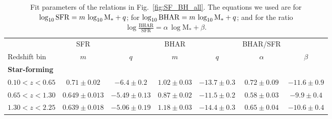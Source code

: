 \begin{table}
\caption{Fit parameters of the relations in Fig.~\ref{fig:SF_BH_all}. The equations we used are for $\log_{10}{\rm SFR}=m\,\log_{10}{\rm M}_*+q$; for $\log_{10}{\rm BHAR}=m\,\log_{10}{\rm M}_*+q$; and for the ratio $\log\frac{\text{BHAR}}{\text{SFR}}=\alpha\,\log\text{M}_*+\beta$.}             %
\label{table:all_fitpar}      %
\centering                          %
\begin{tabular}{l | c c | c c | c c }        %
\hline\hline                 %
              & SFR                 &                  & BHAR              &                   & BHAR/SFR          &                    \\
Redshift bin  & $m $                & $q$              & $m$               & $q$               & $\alpha$          & $\beta$            \\    %
\hline                                                                                                           
\textbf{Star-forming} &              &                  &                   &                   &                   &       \\
$0.10<z<0.65$ & $ 0.71  \pm 0.02  $ & $ -6.4 \pm 0.2 $ & $ 1.02 \pm 0.03 $ & $-13.7 \pm 0.3$ & $ 0.72 \pm 0.09 $ & $ -11.6  \pm 0.9  $ \\    
$0.65<z<1.30$ & $ 0.649 \pm 0.013 $ & $ -5.49\pm 0.13$ & $ 0.87 \pm 0.02 $ & $-11.5 \pm 0.2$ & $ 0.58 \pm 0.03 $ & $  -9.9  \pm 0.4  $ \\
$1.30<z<2.25$ & $ 0.639 \pm 0.018 $ & $ -5.06\pm 0.19$ & $ 1.18 \pm 0.03 $ & $-14.4 \pm 0.3$ & $ 0.65 \pm 0.04 $ & $ -10.6  \pm 0.4  $ \\

\end{tabular}
\end{table}
